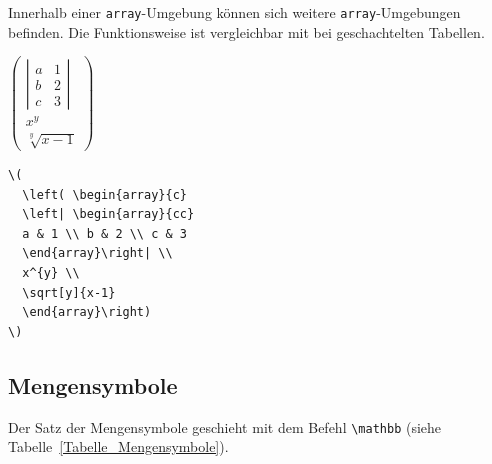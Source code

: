 \documentclass[a4paper,10pt,twoside]{scrbook}
\begin{document}
Innerhalb einer \verb!array!-Umgebung können sich weitere 
\verb!array!-Umgebungen befinden. Die Funktionsweise ist vergleichbar mit 
bei geschachtelten Tabellen.


\begin{minipage}[c]{.38\textwidth}
\setlength{\parskip}{1em}
\centering
\(
  \left( \begin{array}{c}
  \left| \begin{array}{cc}
  a & 1 \\ b & 2 \\ c & 3 
  \end{array}\right| \\
  x^{y} \\
  \sqrt[y]{x-1}
  \end{array}\right)
\)
\end{minipage}
\hfill
\begin{minipage}[c]{.6\textwidth}
\setlength{\parskip}{1em}
\begin{lstlisting}[label=arraybeispiel2, style=customlatex]
\(
  \left( \begin{array}{c}
  \left| \begin{array}{cc}
  a & 1 \\ b & 2 \\ c & 3 
  \end{array}\right| \\
  x^{y} \\
  \sqrt[y]{x-1}
  \end{array}\right)
\)
\end{lstlisting}
\end{minipage}


\subsection{Mengensymbole}


Der Satz der Mengensymbole geschieht mit dem Befehl \verb!\mathbb!
(siehe Tabelle~\ref{Tabelle_Mengensymbole}).


\end{document}
